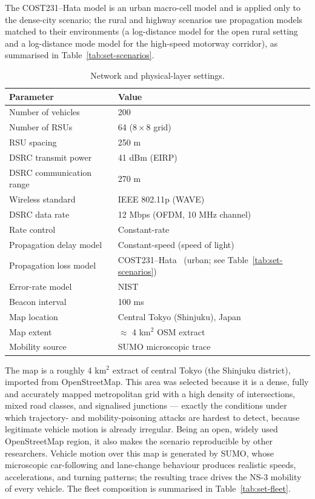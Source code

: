 \documentclass[12pt, a4paper]{report}
\begin{document}
The COST231--Hata model is an urban macro-cell model and is applied only to the dense-city scenario; the rural and highway scenarios use propagation models matched to their environments (a log-distance model for the open rural setting and a log-distance mode model for the high-speed motorway corridor), as summarised in Table~\ref{tab:set-scenarios}.
\begin{table}[H]
\centering
\caption{Network and physical-layer settings.}
\label{tab:set-network}
\begin{tabular}{|l|l|}
\hline
\textbf{Parameter} & \textbf{Value} \\
\hline
Number of vehicles            & 200 \\
\hline
Number of RSUs                & 64 (8\,$\times$\,8 grid) \\
\hline
RSU spacing                   & 250 m \\
\hline
DSRC transmit power           & 41 dBm (EIRP)~\cite{ieee80211p2010, fcc2004dsrc} \\
\hline
DSRC communication range      & 270 m~\cite{kenney2011dedicated} \\
\hline
Wireless standard             & IEEE 802.11p (WAVE)~\cite{ieee80211p2010} \\
\hline
DSRC data rate                & 12 Mbps (OFDM, 10 MHz channel)~\cite{jiang2008ieee} \\
\hline
Rate control                  & Constant-rate \\
\hline
Propagation delay model       & Constant-speed (speed of light) \\
\hline
Propagation loss model        & COST231--Hata~\cite{cost231hata} (urban; see Table~\ref{tab:set-scenarios}) \\
\hline
Error-rate model              & NIST \\
\hline
Beacon interval               & 100 ms~\cite{saej27352016} \\
\hline
Map location                  & Central Tokyo (Shinjuku), Japan \\
\hline
Map extent                    & $\approx$ 4 km$^2$ OSM extract \\
\hline
Mobility source               & SUMO microscopic trace \\
\hline
\end{tabular}
\end{table}

The map is a roughly 4 km$^2$ extract of central Tokyo (the Shinjuku district),
imported from OpenStreetMap. This area was selected because it is a dense,
fully and accurately mapped metropolitan grid with a high density of
intersections, mixed road classes, and signalised junctions --- exactly the
conditions under which trajectory- and mobility-poisoning attacks are hardest to
detect, because legitimate vehicle motion is already irregular. Being an open,
widely used OpenStreetMap region, it also makes the scenario reproducible by
other researchers. Vehicle motion over this map is generated by SUMO, whose
microscopic car-following and lane-change behaviour produces realistic speeds,
accelerations, and turning patterns; the resulting trace drives the NS-3
mobility of every vehicle. The fleet composition is summarised in
Table~\ref{tab:set-fleet}.
\end{document}
